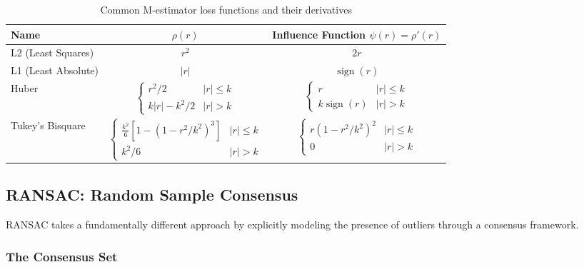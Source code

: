 \documentclass[12pt]{article}
\DeclareMathOperator{\sign}{sign}
\newcommand{\abs}[1]{\left| #1 \right|}
\theoremstyle{definition}
\begin{document}
\begin{table}[h]
    \centering
    \begin{tabular}{lcc}
        \toprule
        Name                & $\rho(r)$                                                                                          & Influence Function $\psi(r) = \rho'(r)$                                        \\
        \midrule
        L2 (Least Squares)  & $r^2$                                                                                              & $2r$                                                                           \\
        L1 (Least Absolute) & $\abs{r}$                                                                                          & $\sign(r)$                                                                     \\
        Huber               & $\begin{cases} r^2/2 & \abs{r} \leq k \\ k\abs{r} - k^2/2 & \abs{r} > k \end{cases}$               & $\begin{cases} r & \abs{r} \leq k \\ k\sign(r) & \abs{r} > k \end{cases}$      \\
        Tukey's Bisquare    & $\begin{cases} \frac{k^2}{6}[1-(1-r^2/k^2)^3] & \abs{r} \leq k \\ k^2/6 & \abs{r} > k \end{cases}$ & $\begin{cases} r(1-r^2/k^2)^2 & \abs{r} \leq k \\ 0 & \abs{r} > k \end{cases}$ \\
        \bottomrule
    \end{tabular}
    \caption{Common M-estimator loss functions and their derivatives}
\end{table}

\subsection{RANSAC: Random Sample Consensus}

RANSAC takes a fundamentally different approach by explicitly modeling the presence of outliers through a consensus framework.

\subsubsection{The Consensus Set}
\end{document}

